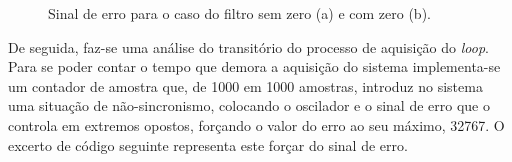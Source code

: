 \documentclass[11pt]{article}
\numberwithin{equation}{section}
\begin{document}
{\begin{figure}[H]
	\centering
	\hspace{8mm}
	\vspace{-0.8em}
	\caption{Sinal de erro para o caso do filtro sem zero (a) e com zero (b).}
	\vspace{-0.8em}
\end{figure}


De seguida, faz-se uma análise do transitório do processo de aquisição do \textit{loop}. Para se poder contar o tempo que demora a aquisição do sistema implementa-se um contador de amostra que, de 1000 em 1000 amostras, introduz no sistema uma situação de não-sincronismo, colocando o oscilador e o sinal de erro que o controla em extremos opostos, forçando o valor do erro ao seu máximo, 32767. O excerto de código seguinte representa este forçar do sinal de erro.

}
\end{document}
